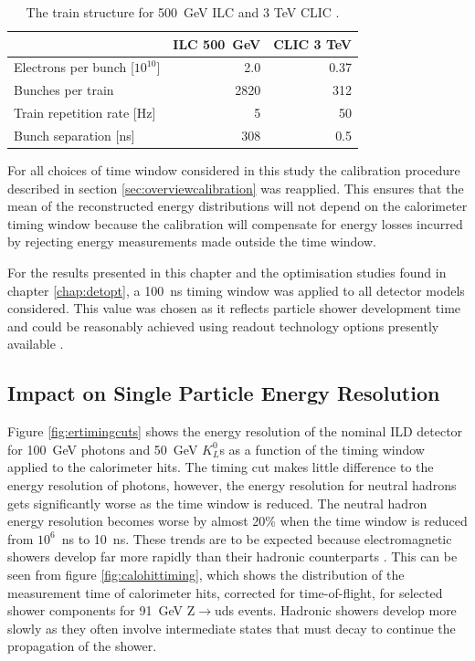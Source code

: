 \begin{table}[h!]
\centering
\begin{tabular}{l r r}
\hline
& ILC 500~GeV & CLIC 3 TeV \\
\hline
Electrons per bunch [$10^{10}$] & 2.0 & 0.37 \\
Bunches per train & 2820 & 312 \\
Train repetition rate [Hz] & 5 & 50 \\
Bunch separation [ns] & 308 & 0.5 \\
\end{tabular}
\caption[The train structure for 500~GeV ILC and 3 TeV CLIC \cite{Behnke:2013lya,Linssen:2012hp}.]{The train structure for 500~GeV ILC and 3 TeV CLIC \cite{Behnke:2013lya,Linssen:2012hp}.}
\label{table:trainstructure}
\end{table}

For all choices of time window considered in this study the calibration procedure described in section \ref{sec:overviewcalibration} was reapplied.  This ensures that the mean of the reconstructed energy distributions will not depend on the calorimeter timing window because the calibration will compensate for energy losses incurred by rejecting energy measurements made outside the time window.  

For the results presented in this chapter and the optimisation studies found in chapter \ref{chap:detopt}, a 100~ns timing window was applied to all detector models considered.  This value was chosen as it reflects particle shower development time \cite{Linssen:2012hp} and could be reasonably achieved using readout technology options presently available \cite{Adloff:2014rya}.  


\subsection{Impact on Single Particle Energy Resolution}
Figure \ref{fig:ertimingcuts} shows the energy resolution of the nominal ILD detector for 100~GeV photons and 50~GeV $K^{0}_{L}$s as a function of the timing window applied to the calorimeter hits.  The timing cut makes little difference to the energy resolution of photons, however, the energy resolution for neutral hadrons gets significantly worse as the time window is reduced.  The neutral hadron energy resolution becomes worse by almost 20\% when the time window is reduced from $10^{6}$~ns to 10~ns.  These trends are to be expected because electromagnetic showers develop far more rapidly than their hadronic counterparts \cite{Wigmans:2000vf}.  This can be seen from figure \ref{fig:calohittiming}, which shows the distribution of the measurement time of calorimeter hits, corrected for time-of-flight, for selected shower components for 91~GeV Z$\rightarrow$uds events.  Hadronic showers develop more slowly as they often involve intermediate states that must decay to continue the propagation of the shower.  

